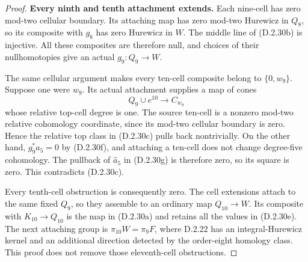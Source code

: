 \begin{proof}
\medskip\noindent
\textbf{Every ninth and tenth attachment extends.}
Each nine-cell has zero mod-two cellular boundary.
Its attaching map has zero mod-two Hurewicz in $Q_8$,
so its composite with $g_8$ has zero Hurewicz in $W$.
The middle line of \textup{(D.2.30b)} is injective.
All these composites are therefore null, and choices
of their nullhomotopies give an actual $g_9:Q_9\to W$.

The same cellular argument makes every ten-cell
composite belong to $\{0,w_9\}$.
Suppose one were $w_9$. Its actual attachment supplies
a map of cones
\[
 Q_9\cup e^{10}\longrightarrow C_{w_9}
 \tag{D.2.30g}
\]
whose relative top-cell degree is one. The source
ten-cell is a nonzero mod-two relative cohomology
coordinate, since its mod-two cellular boundary is
zero. Hence the relative top class in
\textup{(D.2.30c)} pulls back nontrivially.
On the other hand, $g_9^*a_5=0$ by
\textup{(D.2.30f)}, and attaching a ten-cell does not
change degree-five cohomology. The pullback of
$\widehat a_5$ in \textup{(D.2.30g)} is therefore
zero, so its square is zero. This contradicts
\textup{(D.2.30c)}.

Every tenth-cell obstruction is consequently zero.
The cell extensions attach to the same fixed $Q_9$,
so they assemble to an ordinary map $Q_{10}\to W$.
Its composite with $K_{10}\to Q_{10}$ is the map
in \textup{(D.2.30a)} and retains all the values
in \textup{(D.2.30e)}.
The next attaching group is $\pi_{10}W=\pi_9F$,
where D.2.22 has an integral-Hurewicz kernel and
an additional direction detected by the order-eight
homology class. This proof does not remove those
eleventh-cell obstructions.
\end{proof}
